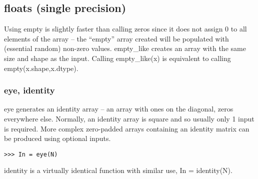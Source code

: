 \documentclass[KSmain.tex]{subfiles}
\begin{document}
\subsection{floats (single precision)}
Using empty is slightly faster than calling zeros since it does not assign 0 to all elements of the array –
the “empty” array created will be populated with (essential random) non-zero values. empty\_like creates
an array with the same size and shape as the input. Calling empty\_like(x) is equivalent to calling
empty(x.shape,x.dtype).
\subsubsection{eye, identity}
eye generates an identity array – an array with ones on the diagonal, zeros everywhere else. Normally,
an identity array is square and so usually only 1 input is required. More complex zero-padded arrays
containing an identity matrix can be produced using optional inputs.
\begin{framed}
\begin{verbatim}
>>> In = eye(N)
\end{verbatim}
\end{framed}
identity is a virtually identical function with similar use, In = identity(N).
\end{document}
